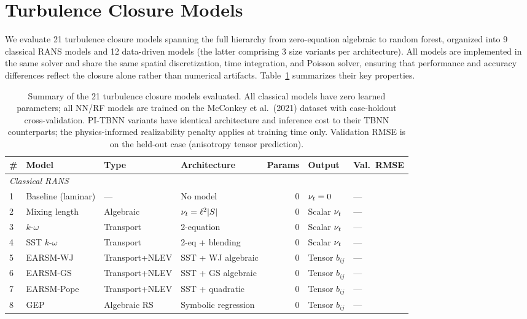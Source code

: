 \section{Turbulence Closure Models}
\label{sec:closures}

We evaluate 21 turbulence closure models spanning the full hierarchy from zero-equation algebraic to random forest, organized into 9 classical RANS models and 12 data-driven models (the latter comprising 3 size variants per architecture).
All models are implemented in the same solver and share the same spatial discretization, time integration, and Poisson solver, ensuring that performance and accuracy differences reflect the closure alone rather than numerical artifacts.
Table~\ref{tab:model_summary} summarizes their key properties.

\begin{table}[htbp]
\centering
\caption{Summary of the 21 turbulence closure models evaluated. All classical models have zero learned parameters; all NN/RF models are trained on the McConkey et al.\ (2021) dataset with case-holdout cross-validation. PI-TBNN variants have identical architecture and inference cost to their TBNN counterparts; the physics-informed realizability penalty applies at training time only. Validation RMSE is on the held-out case (anisotropy tensor prediction).}
\label{tab:model_summary}
\small
\begin{tabular}{llllrll}
\toprule
\# & Model & Type & Architecture & Params & Output & Val.\ RMSE \\
\midrule
\multicolumn{7}{l}{\textit{Classical RANS}} \\
1  & Baseline (laminar) & --- & No model & 0 & $\nu_t = 0$ & --- \\
2  & Mixing length      & Algebraic & $\nu_t = \ell^2 |S|$ & 0 & Scalar $\nu_t$ & --- \\
3  & $k$-$\omega$       & Transport & 2-equation & 0 & Scalar $\nu_t$ & --- \\
4  & SST $k$-$\omega$   & Transport & 2-eq + blending & 0 & Scalar $\nu_t$ & --- \\
5  & EARSM-WJ           & Transport+NLEV & SST + WJ algebraic & 0 & Tensor $b_{ij}$ & --- \\
6  & EARSM-GS           & Transport+NLEV & SST + GS algebraic & 0 & Tensor $b_{ij}$ & --- \\
7  & EARSM-Pope          & Transport+NLEV & SST + quadratic & 0 & Tensor $b_{ij}$ & --- \\
8  & GEP                & Algebraic RS & Symbolic regression & 0 & Tensor $b_{ij}$ & --- \\

\end{tabular}
\end{table}
